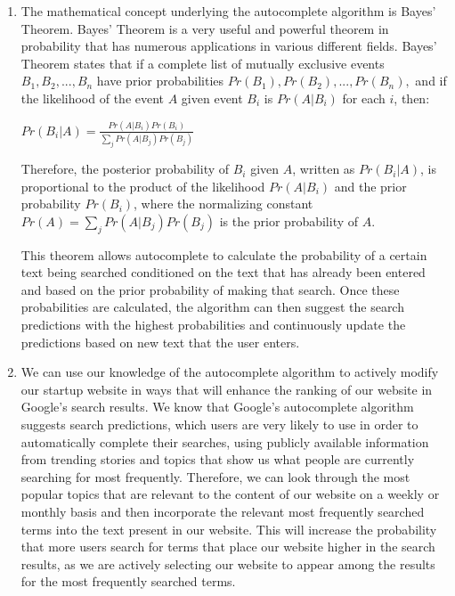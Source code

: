 \documentclass[12pt]{article}
\begin{document}
\begin{enumerate}
    \item The mathematical concept underlying the autocomplete algorithm is Bayes' Theorem. Bayes' Theorem is a very useful and powerful theorem in probability that has numerous applications in various different fields. Bayes' Theorem states that if a complete list of mutually exclusive events $B_1, B_2, ... , B_n$ have prior probabilities $Pr(B_1), Pr(B_2), ... , Pr(B_n),$ and if the likelihood of the event $A$ given event $B_i$ is $Pr(A|B_i)$ for each $i$, then:

    \begin{center}
    $Pr(B_i|A) = \frac{Pr(A|B_i)Pr(B_i)}{\sum\limits_jPr(A|B_j)Pr(B_j)}$
    \end{center}

    Therefore, the posterior probability of $B_i$ given $A$, written as $Pr(B_i|A)$, is proportional to the product of the likelihood $Pr(A|B_i)$ and the prior probability $Pr(B_i)$, where the normalizing constant $Pr(A) = \sum\limits_jPr(A|B_j)Pr(B_j)$ is the prior probability of $A$.

    \qquad This theorem allows autocomplete to calculate the probability of a certain text being searched conditioned on the text that has already been entered and based on the prior probability of making that search. Once these probabilities are calculated, the algorithm can then suggest the search predictions with the highest probabilities and continuously update the predictions based on new text that the user enters.

    \item We can use our knowledge of the autocomplete algorithm to actively modify our startup website in ways that will enhance the ranking of our website in Google's search results. We know that Google's autocomplete algorithm suggests search predictions, which users are very likely to use in order to automatically complete their searches, using publicly available information from trending stories and topics that show us what people are currently searching for most frequently. Therefore, we can look through the most popular topics that are relevant to the content of our website on a weekly or monthly basis and then incorporate the relevant most frequently searched terms into the text present in our website. This will increase the probability that more users search for terms that place our website higher in the search results, as we are actively selecting our website to appear among the results for the most frequently searched terms.


\end{enumerate}
\end{document}
